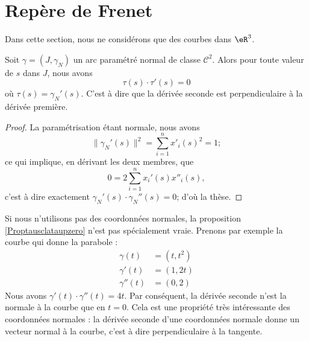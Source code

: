 \section{Repère de Frenet}      \label{SecFrenet}

Dans cette section, nous ne considérons que des courbes dans $\eR^3$.

\begin{proposition}     \label{Proptausclataupzero}
    Soit $\gamma=(J,\gamma_N)$ un arc paramétré normal de classe $\mathcal{C}^2$. Alors pour toute valeur de $s$ dans $J$, nous avons
    \begin{equation}
        \tau(s)\cdot\tau'(s)=0
    \end{equation}
    où $\tau(s)=\gamma_N'(s)$. C'est à dire que la dérivée seconde est perpendiculaire à la dérivée première.
\end{proposition}

\begin{proof}
    La paramétrisation étant normale, nous avons 
    \begin{equation}
        \| \gamma_N'(s) \|^2=\sum_{i=1}^nx'_i(s)^2=1;
    \end{equation}
    ce qui implique, en dérivant les deux membres, que
    \begin{equation}
        0=2\sum_{i=1}^nx_i'(s)x''_i(s),
    \end{equation}
    c'est à dire exactement $\gamma_N'(s)\cdot \gamma_N''(s)=0$; d'où la thèse.
\end{proof}

\begin{remark}
    Si nous n'utilisons pas des coordonnées normales, la proposition \ref{Proptausclataupzero} n'est pas spécialement vraie. Prenons par exemple la courbe qui donne la parabole :
    \begin{subequations}
        \begin{align}
            \gamma(t)&=(t,t^2)\\
            \gamma'(t)&=(1,2t)\\
            \gamma''(t)&=(0,2)
        \end{align}
    \end{subequations}
    Nous avons $\gamma'(t)\cdot \gamma''(t)=4t$. Par conséquent, la dérivée seconde n'est la normale à la courbe que en $t=0$. Cela est une propriété très intéressante des coordonnées normales : la dérivée seconde d'une coordonnées normale donne un vecteur normal à la courbe, c'est à dire perpendiculaire à la tangente.
\end{remark}

